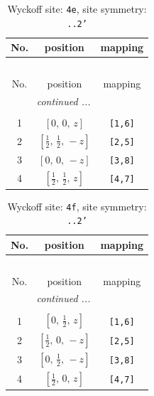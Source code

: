 \documentclass[fleqn,8pt]{jsarticle}
\begin{document}
\begin{longtable}{ccc}
\caption{Wyckoff site: {\tt 4e}, site symmetry: {\tt ..2'}}
 \\
 \hline \hline
No. & position & mapping \\ \hline \endfirsthead

\multicolumn{2}{l}{\tablename\ \thetable{}} \\
 \hline \hline
No. & position & mapping \\ \hline \endhead

 \hline \hline
\multicolumn{2}{r}{\footnotesize\it continued ...} \\ \endfoot

 \hline \hline
\multicolumn{2}{r}{} \\ \endlastfoot

1 & $\left[ 0,\, 0,\, z \right]$ & {\tt [1,6]} \\ \hline
2 & $\left[ \frac{1}{2},\, \frac{1}{2},\, - z \right]$ & {\tt [2,5]} \\ \hline
3 & $\left[ 0,\, 0,\, - z \right]$ & {\tt [3,8]} \\ \hline
4 & $\left[ \frac{1}{2},\, \frac{1}{2},\, z \right]$ & {\tt [4,7]} \\
\end{longtable}
\renewcommand{\arraystretch}{1.2}
\begin{longtable}{ccc}
\caption{Wyckoff site: {\tt 4f}, site symmetry: {\tt ..2'}}
 \\
 \hline \hline
No. & position & mapping \\ \hline \endfirsthead

\multicolumn{2}{l}{\tablename\ \thetable{}} \\
 \hline \hline
No. & position & mapping \\ \hline \endhead

 \hline \hline
\multicolumn{2}{r}{\footnotesize\it continued ...} \\ \endfoot

 \hline \hline
\multicolumn{2}{r}{} \\ \endlastfoot

1 & $\left[ 0,\, \frac{1}{2},\, z \right]$ & {\tt [1,6]} \\ \hline
2 & $\left[ \frac{1}{2},\, 0,\, - z \right]$ & {\tt [2,5]} \\ \hline
3 & $\left[ 0,\, \frac{1}{2},\, - z \right]$ & {\tt [3,8]} \\ \hline
4 & $\left[ \frac{1}{2},\, 0,\, z \right]$ & {\tt [4,7]} \\
\end{longtable}
\end{document}
